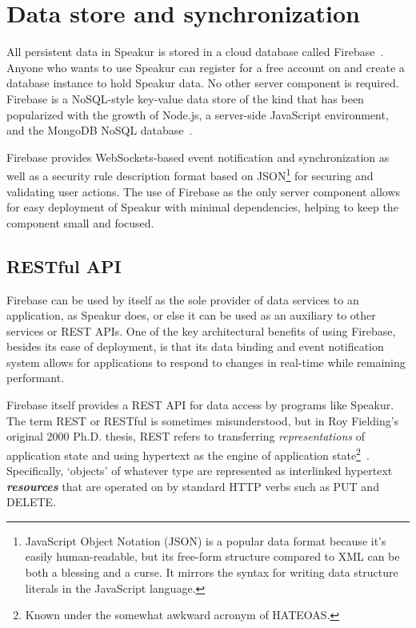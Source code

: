 \section{Data store and synchronization}
All persistent data in Speakur is stored in a cloud database called Firebase~\cite{firebasecontributors2015}.
Anyone who wants to use Speakur can register for a free account on  and create a database instance to hold Speakur data.
No other server component is required.
Firebase is a NoSQL-style key-value data store of the kind that has been popularized
with the growth of 
Node.js, a server-side JavaScript environment,
and the MongoDB NoSQL database~\cite{dickey2014}.

Firebase provides WebSockets-based event notification and synchronization 
as well as a security rule description format based on 
JSON\footnote{JavaScript Object Notation (JSON) is a popular data format because it's easily human-readable, 
but its free-form structure compared to XML can be both a blessing and a curse.  
It mirrors the syntax for writing data structure literals in the JavaScript language.} 
for securing and validating user actions.
The use of Firebase as the only server component allows for easy deployment of Speakur with minimal dependencies, helping to keep the component small and focused.

\subsection{RESTful API}
Firebase can be used by itself as the sole provider of data services to an application, as Speakur does, or else it can be used as an auxiliary to other services or REST APIs.
One of the key architectural benefits of using Firebase, 
besides its ease of deployment, 
is that its data binding and event notification system allows for 
applications to respond to changes in real-time while remaining performant.

Firebase itself provides a REST API for data access by programs like Speakur.
The term REST or RESTful is sometimes misunderstood,
but in Roy Fielding's original 2000 Ph.D. thesis, 
REST refers to transferring \textit{representations} of application state and using hypertext as the engine of 
application state\footnote{Known under the somewhat awkward acronym of HATEOAS.}~\cite{fielding2000}.
Specifically, `objects' of whatever type are represented as interlinked hypertext \textbf{\textit{resources}} that are operated on by standard HTTP verbs such as PUT and DELETE.


